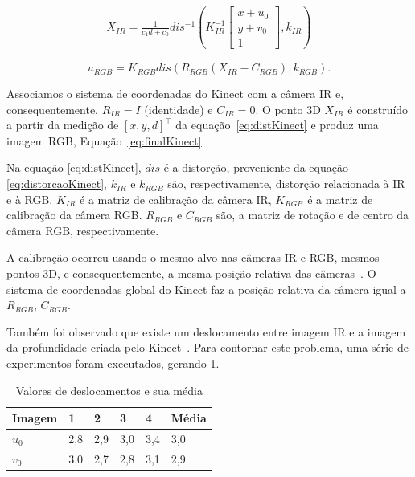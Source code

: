 \begin{gather} 
X_{IR} = \frac{1}{c_1 d + c_0}dis^{-1}\left ( K^{-1}_{IR}
\begin{bmatrix}
x+u_0\\ 
y+v_0\\ 
1
\end{bmatrix},k_{IR} 
\right )
\label{eq:distKinect}
\end{gather}

\begin{equation}
\label{eq:finalKinect}
u_{RGB} = K_{RGB} dis(R_{RGB}(X_{IR} - C_{RGB}),k_{RGB}).
\end{equation}

Associamos o sistema de coordenadas do Kinect com a câmera IR e,
consequentemente, $R_{IR} = I$ (identidade) e $C_{IR} = 0$.  O ponto 3D $X_{IR}$
é construído a partir da medição de $[x,y,d]^\top$ da equação~\ref{eq:distKinect} e
produz uma imagem RGB, Equação~\ref{eq:finalKinect}.

Na equação \ref{eq:distKinect}, $dis$ é a distorção, proveniente da equação
\ref{eq:distorcaoKinect}, $k_{IR}$ e $k_{RGB}$ são, respectivamente, distorção
relacionada à IR e à RGB.  $K_{IR}$ é a matriz de calibração da câmera IR,
$K_{RGB}$ é a matriz de calibração da câmera RGB. $R_{RGB}$ e $C_{RGB}$ são, a
matriz de rotação e de centro da câmera RGB, respectivamente.

A calibração ocorreu usando o mesmo alvo nas câmeras IR e RGB, mesmos pontos 3D,
e consequentemente, a mesma posição relativa das câmeras~\cite{smisek20133d}.  O sistema de
coordenadas global do Kinect faz a posição relativa da câmera igual a $R_{RGB}$,
$C_{RGB}$.

Também foi observado que existe um deslocamento entre imagem IR e a imagem da
profundidade criada pelo Kinect~\cite{smisek20133d}. Para contornar este problema, uma série de
experimentos foram executados, gerando \ref{tab:deslocamentoKinect}.

\begin{table}[!h]
\centering
\caption{Valores de deslocamentos e sua média}
\label{tab:deslocamentoKinect}
\begin{tabular}{|l|l|l|l|l|l|}
\hline
Imagem & 1   & 2   & 3   & 4   & Média \\ \hline
$u_0$  & 2,8 & 2,9 & 3,0 & 3,4 & 3,0   \\ \hline
$v_0$  & 3,0 & 2,7 & 2,8 & 3,1 & 2,9   \\ \hline
\end{tabular}
\end{table}

